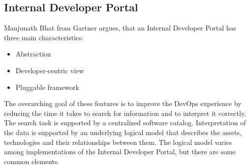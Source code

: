\documentclass[a4paper,12pt]{article}
\begin{document}
    \subsection{Internal Developer Portal}
    \label{subsec:vpportal}
    Manjunath Bhat from Gartner argues, that an Internal Developer Portal has three main characteristics\parencite{gartner}:
    \begin{itemize}
        \item Abstraction
        \item Developer-centric view
        \item Pluggable framework
    \end{itemize}
    The overarching goal of these features is to improve the DevOps experience by reducing the time it takes to search
    for information and to interpret it correctly.
    The search task is supported by a centralized software catalog.
    Interpretation of the data is supported by an underlying logical model that describes the assets, technologies
    and their relationships between them.
    The logical model varies among implementations of the Internal Developer Portal, but there are some common elements.
\end{document}
